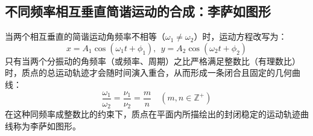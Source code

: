 
\subsection{不同频率相互垂直简谐运动的合成：李萨如图形}

当两个相互垂直的简谐运动角频率不相等（$\omega_1 \neq \omega_2$）时，运动方程改写为：$$x = A_1 \cos(\omega_1 t + \phi_1),~~y = A_2 \cos(\omega_2 t + \phi_2)$$
只有当两个分振动的角频率（或频率、周期）之比严格满足整数比（有理数比）时，质点的总运动轨迹才会随时间演入重合，从而形成一条闭合且固定的几何曲线：$$\frac{\omega_1}{\omega_2} = \frac{\nu_1}{\nu_2} = \frac{m}{n} \quad (m, n \in \mathbb{Z}^+)$$在这种同频率成整数比的约束下，质点在平面内所描绘出的封闭稳定的运动轨迹曲线称为李萨如图形。
